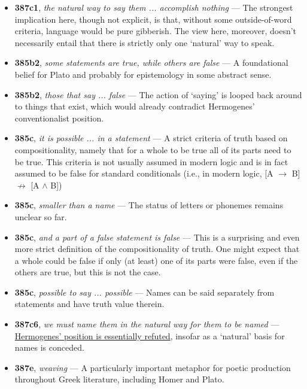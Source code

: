 \documentclass[12pt]{article}
\begin{document}
\begin{itemize}
\item \textbf{387c1}, \textit{the natural way to say them ... accomplish nothing} --- The strongest implication here, though not explicit, is that, without some outside-of-word criteria, language would be pure gibberish. The view here, moreover, doesn't necessarily entail that there is strictly only one `natural' way to speak.

\item \textbf{385b2}, \textit{some statements are true, while others are false} --- A foundational belief for Plato and probably for epistemology in some abstract sense.

\item \textbf{385b2}, \textit{those that say ... false} --- The action of `saying' is looped back around to things that exist, which would already contradict Hermogenes' conventionalist position.

\item \textbf{385c}, \textit{it is possible ... in a statement} --- A strict criteria of truth based on compositionality, namely that for a whole to be true all of its parts need to be true. This criteria is not usually assumed in modern logic and is in fact assumed to be false for standard conditionals (i.e., in modern logic, [A $\rightarrow$ B] $\nrightarrow$ [A $\wedge$ B])

\item \textbf{385c}, \textit{smaller than a name} --- The status of letters or phonemes remains unclear so far.

\item \textbf{385c}, \textit{and a part of a false statement is false} --- This is a surprising and even more strict definition of the compositionality of truth. One might expect that a whole could be false if only (at least) one of its parts were false, even if the others are true, but this is not the case.

\item \textbf{385c}, \textit{possible to say ... possible} --- Names can be said separately from statements and have truth value therein.

\item \textbf{387c6}, \textit{we must name them in the natural way for them to be named} --- \ul{Hermogenes' position is essentially refuted}, insofar as a `natural' basis for names is conceded.

\item \textbf{387e}, \textit{weaving} --- A particularly important metaphor for poetic production throughout Greek literature, including Homer and Plato.


\end{itemize}
\end{document}
